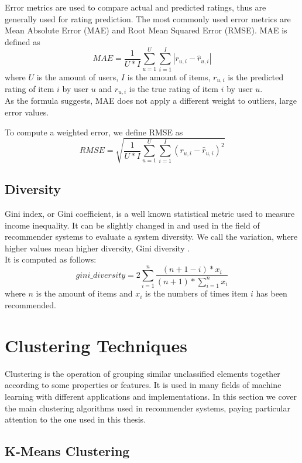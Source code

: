 Error metrics are used to compare actual and predicted ratings, thus are generally used for rating prediction. The most commonly used error metrics are Mean Absolute Error (MAE) and Root Mean Squared Error (RMSE).
MAE is defined as
\[ MAE = \frac{1}{U*I} \sum_{u=1}^{U} \sum_{i=1}^{I} |r_{u,i} - \hat{r}_{u,i}| \]
where $U$ is the amount of users, $I$ is the amount of items, $r_{u,i}$ is the predicted rating of item $i$ by user $u$ and $r_{u,i}$ is the true rating of item $i$ by user $u$.\\
As the formula suggests, MAE does not apply a different weight to outliers, large error values.\par
To compute a weighted error, we define RMSE as
\[ RMSE = \sqrt{\frac{1}{U*I} \sum_{u=1}^{U} \sum_{i=1}^{I} (r_{u,i} - \hat{r}_{u,i})^2} \]


\subsection{Diversity}

Gini index, or Gini coefficient, is a well known statistical metric used to measure income inequality. It can be slightly changed in and used in the field of recommender systems to evaluate a system diversity. We call the variation, where higher values mean higher diversity, Gini diversity \cite{Diversity}.\\
It is computed as follows:
\[ gini\_diversity = 2 \sum_{i=1}^{n} \frac{(n + 1 - i) * x_i}{(n + 1) * \sum_{i=1}^{n} x_i} \]
where $n$ is the amount of items and $x_i$ is the numbers of times item $i$ has been recommended.



\section{Clustering Techniques}

Clustering is the operation of grouping similar unclassified elements together according to some properties or features. It is used in many fields of machine learning with different applications and implementations. In this section we cover the main clustering algorithms used in recommender systems, paying particular attention to the one used in this thesis.


\subsection{K-Means Clustering}

